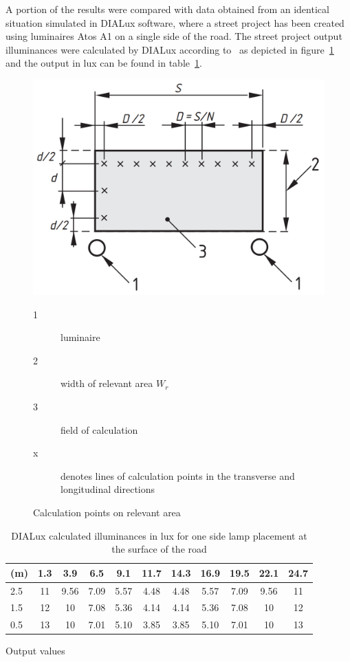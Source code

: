 A portion of the results were compared with data obtained from an identical situation simulated in DIALux software, where a street project has been created using luminaires Atos A1 on a single side of the road. The street project output illuminances were calculated by DIALux according to~\cite{CSN_EN_13201-3} as depicted in figure~\ref{fig:lumIntDistr} and the output in lux can be found in table~\ref{tab:DialuxOneSideLamps}.

\begin{figure}[htb]
  \centering
  \includegraphics[width=0.8\columnwidth]{13201-3_points}
  \caption{Calculation points on relevant area \cite{CSN_EN_13201-3}}
  \label{fig:lumIntDistr}
	\begin{description}
		\item[1] luminaire
		\item[2] width of relevant area $W_{r}$
		\item[3] field of calculation
		\item[x] denotes lines of calculation points in the transverse and longitudinal directions
	\end{description}
\end{figure}

\begin{table}[htb]
	\renewcommand{\arraystretch}{1.3}
	\caption{DIALux calculated illuminances in lux for one side lamp placement at the surface of the road}
 	\label{tab:DialuxOneSideLamps}
	\centering
  \begin{tabular}{ l || c | c | c | c | c | c | c | c | c | c }
    \hline
    \textbf{(m)} & 1.3 & 3.9 & 6.5 & 9.1 & 11.7 & 14.3 & 16.9 & 19.5 & 22.1 & 24.7\\ \hline \hline
    2.5 & 11 & 9.56 & 7.09 & 5.57 & 4.48 & 4.48 & 5.57 & 7.09 & 9.56 & 11\\ \hline
		1.5 & 12 & 10 & 7.08 & 5.36 & 4.14 & 4.14 & 5.36 & 7.08 & 10 & 12\\ \hline
		0.5 & 13 & 10 & 7.01 & 5.10 & 3.85 & 3.85 & 5.10 & 7.01 & 10 & 13\\ \hline
  \end{tabular}
\end{table}

Output values $$
        
